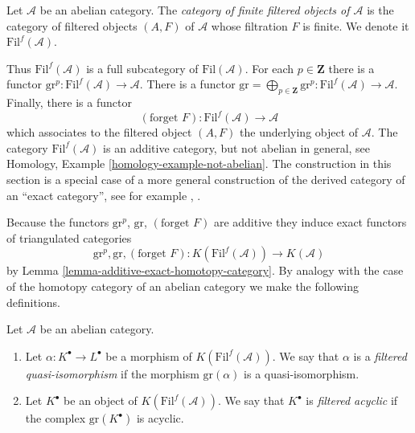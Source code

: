 \begin{definition}
\label{definition-finite-filtered}
Let $\mathcal{A}$ be an abelian category. The
{\it category of finite filtered objects of $\mathcal{A}$}
is the category of filtered objects
$(A, F)$ of $\mathcal{A}$ whose filtration $F$ is finite.
We denote it $\text{Fil}^f(\mathcal{A})$.
\end{definition}

\noindent
Thus $\text{Fil}^f(\mathcal{A})$ is a full subcategory of
$\text{Fil}(\mathcal{A})$. For each $p \in \mathbf{Z}$ there is
a functor
$\text{gr}^p : \text{Fil}^f(\mathcal{A}) \to \mathcal{A}$.
There is a functor
$\text{gr} = \bigoplus_{p \in \mathbf{Z}} \text{gr}^p :
\text{Fil}^f(\mathcal{A}) \to \mathcal{A}$.
Finally, there is a functor
$$
(\text{forget }F) : \text{Fil}^f(\mathcal{A}) \longrightarrow \mathcal{A}
$$
which associates to the filtered object $(A, F)$ the underlying object
of $\mathcal{A}$.
The category $\text{Fil}^f(\mathcal{A})$ is an additive category, but not
abelian in general, see
Homology, Example \ref{homology-example-not-abelian}.
The construction in this section is a special case of a more general
construction of the derived category of an
``exact category'', see for example \cite{Buhler}, \cite{Keller}.

\medskip\noindent
Because the functors $\text{gr}^p$, $\text{gr}$, $(\text{forget }F)$
are additive they induce exact functors of triangulated categories
$$
\text{gr}^p, \text{gr}, (\text{forget }F):
K(\text{Fil}^f(\mathcal{A}))
\longrightarrow
K(\mathcal{A})
$$
by
Lemma \ref{lemma-additive-exact-homotopy-category}.
By analogy with the case of the homotopy category of an abelian category
we make the following definitions.

\begin{definition}
\label{definition-filtered-acyclic}
Let $\mathcal{A}$ be an abelian category.
\begin{enumerate}
\item Let $\alpha : K^\bullet \to L^\bullet$ be a morphism of
$K(\text{Fil}^f(\mathcal{A}))$. We say that
$\alpha$ is a {\it filtered quasi-isomorphism} if
the morphism $\text{gr}(\alpha)$ is a quasi-isomorphism.
\item Let $K^\bullet$ be an object of $K(\text{Fil}^f(\mathcal{A}))$.
We say that $K^\bullet$ is {\it filtered acyclic} if
the complex $\text{gr}(K^\bullet)$ is acyclic.
\end{enumerate}
\end{definition}

